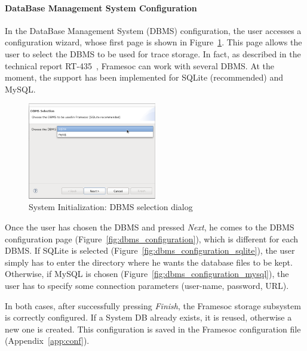 \documentclass[twoside]{article}
\begin{document}
\begin{sloppypar}
\paragraph{DataBase Management System Configuration}
\label{subsec:init}

In the DataBase Management System (DBMS) configuration, the user accesses a configuration wizard, whose first page is shown in Figure~\ref{fig:dbms_selection}. 
This page allows the user to select the DBMS to be used for trace storage.
In fact, as described in the technical report RT-435~\cite{pagano:hal-00830008}, Framesoc can work with several DBMS.
At the moment, the support has been implemented for SQLite (recommended) and MySQL.

\begin{figure}[h!]
  \centering
    \includegraphics[width=0.5\textwidth]{images/dbms_selection.png}
  \caption{System Initialization: DBMS selection dialog}
  \label{fig:dbms_selection}
\end{figure}

Once the user has chosen the DBMS and pressed \emph{Next}, he comes to the DBMS configuration page (Figure~\ref{fig:dbms_configuration}), which is different for each DBMS.
If SQLite is selected (Figure~\ref{fig:dbms_configuration_sqlite}), the user simply has to enter the directory where he wants the database files to be kept.
Otherwise, if MySQL is chosen (Figure~\ref{fig:dbms_configuration_mysql}), the user has to specify some connection parameters (user-name, password, URL).

In both cases, after successfully pressing \emph{Finish}, the Framesoc storage subsystem is correctly configured. 
If a System DB already exists, it is reused, otherwise a new one is created.
This configuration is saved in the Framesoc configuration file (Appendix~\ref{app:conf}). 


\end{sloppypar}
\end{document}
